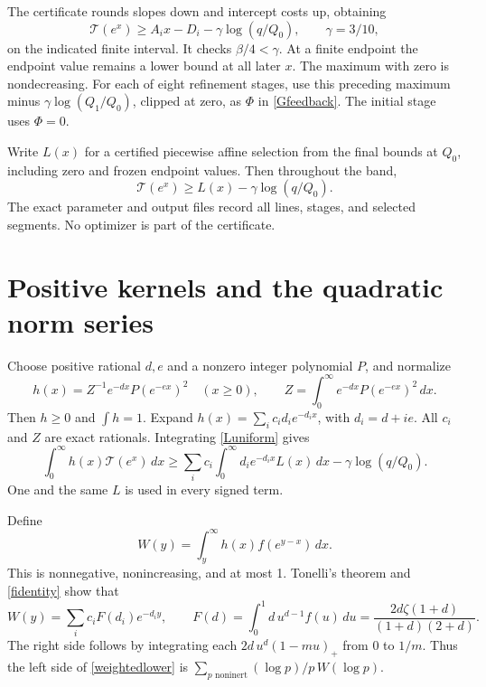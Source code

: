\documentclass[11pt]{article}
\newcommand{\Tn}{\mathcal T}
\begin{document}
The certificate rounds slopes down and intercept costs up, obtaining
\[
 \Tn(e^x)\ge A_i x-D_i-\gamma\log(q/Q_0),\qquad
 \gamma=3/10,
\]
on the indicated finite interval. It checks \(\beta/4<\gamma\).
At a finite endpoint the endpoint value remains a lower bound at
all later \(x\). The maximum with zero is nondecreasing.
For each of eight refinement stages, use this preceding maximum
minus \(\gamma\log(Q_1/Q_0)\), clipped at zero, as \(\Phi\) in
\eqref{Gfeedback}. The initial stage uses \(\Phi=0\).

Write \(L(x)\) for a certified piecewise affine selection from the
final bounds at \(Q_0\), including zero and frozen endpoint values.
Then throughout the band,
\begin{equation}\label{Luniform}
 \Tn(e^x)\ge L(x)-\gamma\log(q/Q_0).
\end{equation}
The exact parameter and output files record all lines, stages, and
selected segments. No optimizer is part of the certificate.

\section{Positive kernels and the quadratic norm series}\label{mellin}
Choose positive rational \(d,e\) and a nonzero integer polynomial
\(P\), and normalize
\[
 h(x)=Z^{-1}e^{-dx}P(e^{-ex})^2\quad(x\ge0),\qquad
 Z=\int_0^\infty e^{-dx}P(e^{-ex})^2\,dx.
\]
Then \(h\ge0\) and \(\int h=1\). Expand
\(h(x)=\sum_i c_i d_i e^{-d_i x}\), with \(d_i=d+ie\).
All \(c_i\) and \(Z\) are exact rationals. Integrating
\eqref{Luniform} gives
\begin{equation}\label{weightedlower}
 \int_0^\infty h(x)\Tn(e^x)\,dx
 \ge\sum_i c_i\!\int_0^\infty d_i e^{-d_i x}L(x)\,dx
             -\gamma\log(q/Q_0).
\end{equation}
One and the same \(L\) is used in every signed term.

Define
\[
 W(y)=\int_y^\infty h(x)f(e^{y-x})\,dx.
\]
This is nonnegative, nonincreasing, and at most 1. Tonelli's theorem
and \eqref{fidentity} show that
\begin{equation}\label{multiplier}
 W(y)=\sum_i c_i F(d_i)e^{-d_i y},\qquad
 F(d)=\int_0^1 d\,u^{d-1}f(u)\,du
       =\frac{2d\zeta(1+d)}{(1+d)(2+d)}.
\end{equation}
The right side follows by integrating each
\(2d\,u^d(1-mu)_+\) from 0 to \(1/m\).
Thus the left side of \eqref{weightedlower} is
\(\sum_{p\text{ noninert}}(\log p)/p\,W(\log p)\).
\end{document}
